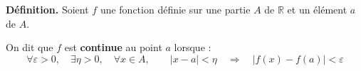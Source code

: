 \textbf{Définition.} Soient $f$ une fonction définie sur une partie $A$ de $\mathds{R}$
et un élément $a$ de $A$.\par
On dit que $f$ est \textbf{continue} au point $a$ lorsque :
\[\forall \varepsilon > 0,\quad
\exists \eta > 0,\quad
\forall x \in A,\qquad
\left\vert x- a \right\vert < \eta \quad \Rightarrow \quad
\left\vert f(x) - f(a) \right\vert < \varepsilon\]